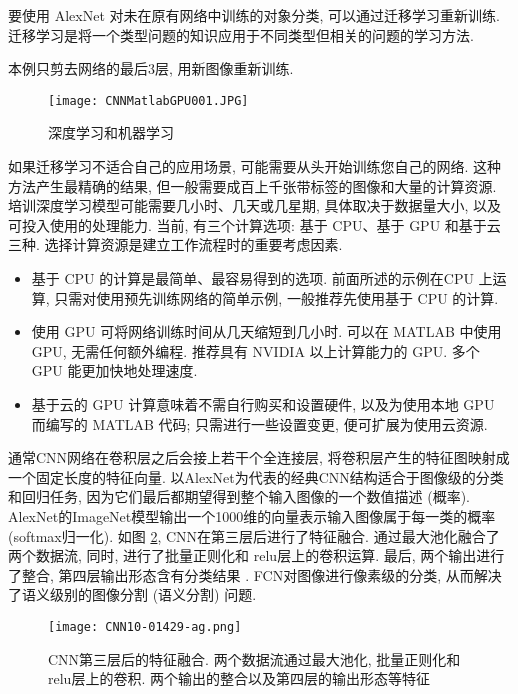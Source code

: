 要使用 AlexNet 对未在原有网络中训练的对象分类, 可以通过迁移学习重新训练.
迁移学习是将一个类型问题的知识应用于不同类型但相关的问题的学习方法. 
\begin{example}
本例只剪去网络的最后3层, 用新图像重新训练.
\begin{figure}[H]
\centering
\texttt{[image: CNNMatlabGPU001.JPG]}
\caption{深度学习和机器学习}
\label{CNNMatlabGPU001}
\end{figure}

如果迁移学习不适合自己的应用场景, 可能需要从头开始训练您自己的网络. 这种方法产生最精确的结果, 但一般需要成百上千张带标签的图像和大量的计算资源.
培训深度学习模型可能需要几小时、几天或几星期, 具体取决于数据量大小, 以及可投入使用的处理能力.
当前, 有三个计算选项: 基于 CPU、基于 GPU 和基于云三种.
选择计算资源是建立工作流程时的重要考虑因素.
\begin{itemize}
\item 基于 CPU 的计算是最简单、最容易得到的选项. 前面所述的示例在CPU 上运算, 只需对使用预先训练网络的简单示例, 一般推荐先使用基于 CPU 的计算.
\item 使用 GPU 可将网络训练时间从几天缩短到几小时. 可以在 MATLAB 中使用 GPU, 无需任何额外编程. 推荐具有 NVIDIA 以上计算能力的 GPU.
多个 GPU 能更加快地处理速度.
\item 基于云的 GPU 计算意味着不需自行购买和设置硬件, 以及为使用本地 GPU 而编写的 MATLAB 代码; 只需进行一些设置变更, 便可扩展为使用云资源.
\end{itemize}
\vspace{-0.2cm}
\end{example}

通常CNN网络在卷积层之后会接上若干个全连接层, 将卷积层产生的特征图映射成一个固定长度的特征向量.
以AlexNet为代表的经典CNN结构适合于图像级的分类和回归任务, 因为它们最后都期望得到整个输入图像的一个数值描述 (概率).
AlexNet的ImageNet模型输出一个1000维的向量表示输入图像属于每一类的概率 (softmax归一化).
如图 \ref{CNN10-01429-ag}, CNN在第三层后进行了特征融合. 通过最大池化融合了两个数据流, 同时, 进行了批量正则化和 relu层上的卷积运算.
最后, 两个输出进行了整合, 第四层输出形态含有分类结果 \cite{PiramanayagamSaber2018-9591}.
FCN对图像进行像素级的分类, 从而解决了语义级别的图像分割 (语义分割) 问题.
\begin{figure}[H]
    \centering
    \texttt{[image: CNN10-01429-ag.png]}
    \caption{CNN第三层后的特征融合. 两个数据流通过最大池化, 批量正则化和 relu层上的卷积. 两个输出的整合以及第四层的输出形态等特征 \cite{PiramanayagamSaber2018-9591}}
    \label{CNN10-01429-ag}
    \vspace{-0.4cm}
\end{figure}

